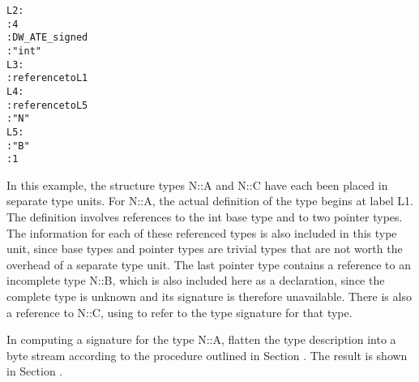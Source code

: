 \begin{alltt}
L2:
          : 4
          : DW\-\_ATE\-\_signed
          : "int"
L3:
          : reference to L1
L4:
          : reference to L5
          : "N"
L5:
            : "B"
            : 1
\end{alltt}

In this example, the structure types N::A and N::C have each
been placed in separate type units.  For N::A, the actual
definition of the type begins at label L1. The definition
involves references to the int base type and to two pointer
types. The information for each of these referenced types is
also included in this type unit, since base types and pointer
types are trivial types that are not worth the overhead of a
separate type unit. The last pointer type contains a reference
to an incomplete type N::B, which is also included here as
a declaration, since the complete type is unknown and its
signature is therefore unavailable. There is also a reference
to N::C, using 
 to refer to the type signature
for that type.

In computing a signature for the type N::A, flatten the type
description into a byte stream according to the procedure
outlined in 
Section .
The result is shown in 
Section .

